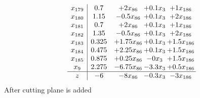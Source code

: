 \documentclass[11pt]{article}
\begin{document}
\[\begin{array}{c| c c@{\hskip 2pt} c@{\hskip 2pt} c@{\hskip 2pt} }
 x_{179}   &  0.7 & + 2 x_{86} & + 0.1 x_{3} & + 1 x_{186}\\
 x_{180}   &  1.15 & -0.5 x_{86} & + 0.1 x_{3} & + 2 x_{186}\\
 x_{181}   &  0.7 & + 2 x_{86} & + 0.1 x_{3} & + 1 x_{186}\\
 x_{182}   &  1.35 & -0.5 x_{86} & + 0.1 x_{3} & + 2 x_{186}\\
 x_{183}   &  0.325 & + 1.75 x_{86} & + 0.1 x_{3} & + 1.5 x_{186}\\
 x_{184}   &  0.475 & + 2.25 x_{86} & + 0.1 x_{3} & + 1.5 x_{186}\\
 x_{185}   &  0.875 & + 0.25 x_{86} & -0 x_{3} & + 1.5 x_{186}\\
 x_{9}   &  2.275 & -6.75 x_{86} & -3.3 x_{3} & + 0.5 x_{186}\\
\hline
z    &  -6 & -8 x_{86} & -0.3 x_{3} & -3 x_{186}\\
\end{array}\]
 After cutting plane is added 
\end{document}
